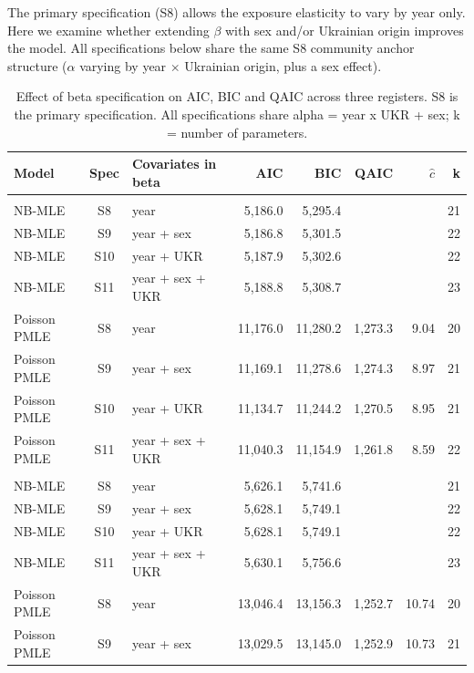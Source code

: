 The primary specification (S8) allows the exposure elasticity to vary by year only. Here we examine whether extending $\beta$ with sex and/or Ukrainian origin improves the model. All specifications below share the same S8 community anchor structure ($\alpha$ varying by year
$\times$ Ukrainian origin, plus a sex effect).


\begin{table}[ht!]
\caption{\label{tbl-beta-comparison}Effect of beta specification on AIC, BIC and QAIC across three registers. S8 is the primary specification. All specifications share alpha = year x UKR + sex; k = number of parameters.} 
\fontsize{8.0pt}{10.0pt}\selectfont
\begin{tabular*}{\linewidth}{@{\extracolsep{\fill}}lclrrrrr}
\toprule
Model & Spec & Covariates in beta & AIC & BIC & QAIC & $\hat c$ & k \\ 
\midrule\addlinespace[2.5pt]
\multicolumn{8}{l}{ZUS} \\[2.5pt] 
\midrule\addlinespace[2.5pt]
NB-MLE & S8 & year & 5,186.0 & 5,295.4 &  &  & 21 \\ 
NB-MLE & S9 & year + sex & 5,186.8 & 5,301.5 &  &  & 22 \\ 
NB-MLE & S10 & year + UKR & 5,187.9 & 5,302.6 &  &  & 22 \\ 
NB-MLE & S11 & year + sex + UKR & 5,188.8 & 5,308.7 &  &  & 23 \\ 
Poisson PMLE & S8 & year & 11,176.0 & 11,280.2 & 1,273.3 & 9.04 & 20 \\ 
Poisson PMLE & S9 & year + sex & 11,169.1 & 11,278.6 & 1,274.3 & 8.97 & 21 \\ 
Poisson PMLE & S10 & year + UKR & 11,134.7 & 11,244.2 & 1,270.5 & 8.95 & 21 \\ 
Poisson PMLE & S11 & year + sex + UKR & 11,040.3 & 11,154.9 & 1,261.8 & 8.59 & 22 \\ 
\midrule\addlinespace[2.5pt]
\multicolumn{8}{l}{Tax} \\[2.5pt] 
\midrule\addlinespace[2.5pt]
NB-MLE & S8 & year & 5,626.1 & 5,741.6 &  &  & 21 \\ 
NB-MLE & S9 & year + sex & 5,628.1 & 5,749.1 &  &  & 22 \\ 
NB-MLE & S10 & year + UKR & 5,628.1 & 5,749.1 &  &  & 22 \\ 
NB-MLE & S11 & year + sex + UKR & 5,630.1 & 5,756.6 &  &  & 23 \\ 
Poisson PMLE & S8 & year & 13,046.4 & 13,156.3 & 1,252.7 & 10.74 & 20 \\ 
Poisson PMLE & S9 & year + sex & 13,029.5 & 13,145.0 & 1,252.9 & 10.73 & 21 \\ 

\end{tabular*}
\end{table}
